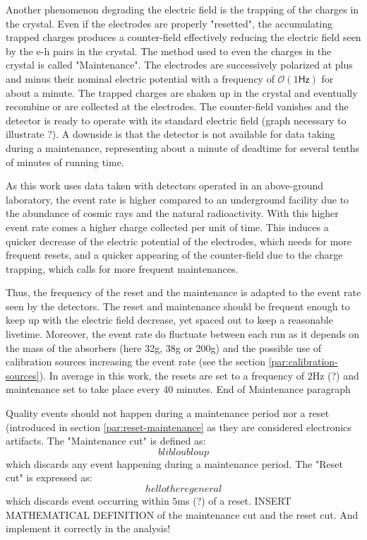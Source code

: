 Another phenomenon degrading the electric field is the trapping of the charges in the crystal. Even if the electrodes are properly "resetted", the accumulating trapped charges produces a counter-field effectively reducing the electric field seen by the e-h pairs in the crystal. The method used to even the charges in the crystal is called "Maintenance". The electrodes are successively polarized at plus and minus their nominal electric potential with a frequency of $\mathcal{O}(1\textsf{Hz})$ for about a minute. The trapped charges are shaken up in the crystal and eventually recombine or are collected at the electrodes. The counter-field vanishes and the detector is ready to operate with its standard electric field (graph necessary to illustrate ?). A downside is that the detector is not available for data taking during a maintenance, representing about a minute of deadtime for several tenths of minutes of running time. 

As this work uses data taken with detectors operated in an above-ground laboratory, the event rate is higher compared to an underground facility due to the abundance of cosmic rays and the natural radioactivity.
With this higher event rate  comes a higher charge collected per unit of time. This induces a quicker decrease of the electric potential of the electrodes, which needs for more frequent resets, and a quicker appearing of the counter-field due to the charge trapping, which calls for more frequent maintenances.

Thus, the frequency of the reset and the maintenance is adapted to the event rate seen by the detectors. The reset and maintenance should be frequent enough to keep up with the electric field decrease, yet spaced out to keep a reasonable livetime. Moreover, the event rate do fluctuate between each run as it depends on the mass of the absorbers (here 32g, 38g or 200g) and the possible use of calibration sources increasing the event rate (see the section \ref{par:calibration-sources}).
In average in this work, the resets are set to a frequency of $2$Hz (?) and maintenance set to take place every 40 minutes.
{\color{red} End of Maintenance paragraph}

Quality events should not happen during a maintenance period nor a reset (introduced in section \ref{par:reset-maintenance} as they are considered electronics artifacts. The "Maintenance cut" is defined as:
$$ bli blou bloup$$
which discards any event happening during a maintenance period.
The "Reset cut" is expressed as:
$$ hello there general$$
which discards event occurring within $5$ms (?) of a reset. 
{\color{red} INSERT MATHEMATICAL DEFINITION of the maintenance cut and the reset cut. And implement it correctly in the analysis! }

